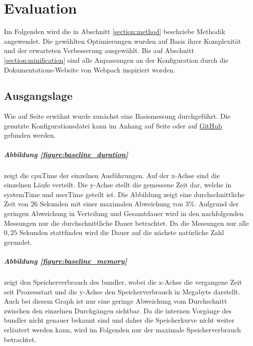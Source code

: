 \documentclass[11pt]{report}
\begin{document}
	\chapter{Evaluation}
		Im Folgenden wird die in Abschnitt \ref{section:method} beschriebe Methodik angewendet. Die gewählten Optimierungen wurden auf Basis ihrer Komplexität und der erwarteten Verbesserung ausgewählt. Bis auf Abschnitt \ref{section:minification} sind alle Anpassungen an der Konfiguration durch die Dokumentations-Website von Webpack inspiriert worden\cite{optimization-source:webpack}.
	
		\section{Ausgangslage}
			Wie auf Seite \pageref{baseline-build} erwähnt wurde zunächst eine Basismessung durchgeführt. Die genutzte Konfigurationsdatei kann im Anhang auf Seite \pageref{figure:baselineConfiguration} oder auf \href{https://github.com/TexNAK/WebBundlerOptimization/blob/d018b3e0db6a861c4f41e38e7265ca8f9d500319/webpack-project/webpack.config.js}{GitHub} gefunden werden.			\paragraph{Abbildung \ref{figure:baseline_duration}} zeigt die \Gls{cpuTime} der einzelnen Ausführungen. Auf der x-Achse sind die einzelnen Läufe verteilt. Die y-Achse stellt die gemessene Zeit dar, welche in \Gls{systemTime} und \Gls{userTime} geteilt ist. Die Abbildung zeigt eine durchschnittliche Zeit von $26$ Sekunden mit einer maximalen Abweichung von $3 \%$. Aufgrund der geringen Abweichung in Verteilung und Gesamtdauer wird in den nachfolgenden Messungen nur die durchschnittliche Dauer betrachtet. Da die Messungen nur alle $0,25$ Sekunden stattfinden wird die Dauer auf die nächste natürliche Zahl gerundet.
			\paragraph{Abbildung \ref{figure:baseline_memory}} zeigt den Speicherverbrauch des \Gls{bundler}, wobei die x-Achse die vergangene Zeit seit Prozessstart und die y-Achse den Speicherverbrauch in Megabyte darstellt. Auch bei diesem Graph ist nur eine geringe Abweichung vom Durchschnitt zwischen den einzelnen Durchgängen sichtbar. Da die internen Vorgänge des \Gls{bundler} nicht genauer bekannt sind und daher die Speicherkurve nicht weiter erläutert werden kann, wird im Folgenden nur der maximale Speicherverbrauch betrachtet.
\end{document}
